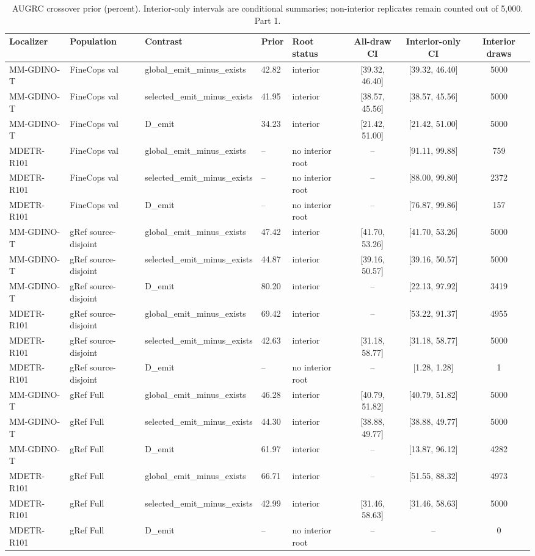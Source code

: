 \begin{table}[t]
\centering\footnotesize
\setlength{\tabcolsep}{3pt}
\renewcommand{\arraystretch}{1.15}
\caption{AUGRC crossover prior (percent). Interior-only intervals are conditional summaries; non-interior replicates remain counted out of 5,000. Part 1.}\label{tab:supp_v6_crossovers_1}
\begin{tabular}{@{}lllllccc@{}}\toprule
Localizer & Population & Contrast & Prior & Root status & All-draw CI & Interior-only CI & Interior draws\\\midrule
MM-GDINO-T & FineCops val & global\_emit\_minus\_exists & 42.82 & interior & [39.32, 46.40] & [39.32, 46.40] & 5000\\
MM-GDINO-T & FineCops val & selected\_emit\_minus\_exists & 41.95 & interior & [38.57, 45.56] & [38.57, 45.56] & 5000\\
MM-GDINO-T & FineCops val & D\_emit & 34.23 & interior & [21.42, 51.00] & [21.42, 51.00] & 5000\\
MDETR-R101 & FineCops val & global\_emit\_minus\_exists & -- & no interior root & -- & [91.11, 99.88] & 759\\
MDETR-R101 & FineCops val & selected\_emit\_minus\_exists & -- & no interior root & -- & [88.00, 99.80] & 2372\\
MDETR-R101 & FineCops val & D\_emit & -- & no interior root & -- & [76.87, 99.86] & 157\\
MM-GDINO-T & gRef source-disjoint & global\_emit\_minus\_exists & 47.42 & interior & [41.70, 53.26] & [41.70, 53.26] & 5000\\
MM-GDINO-T & gRef source-disjoint & selected\_emit\_minus\_exists & 44.87 & interior & [39.16, 50.57] & [39.16, 50.57] & 5000\\
MM-GDINO-T & gRef source-disjoint & D\_emit & 80.20 & interior & -- & [22.13, 97.92] & 3419\\
MDETR-R101 & gRef source-disjoint & global\_emit\_minus\_exists & 69.42 & interior & -- & [53.22, 91.37] & 4955\\
MDETR-R101 & gRef source-disjoint & selected\_emit\_minus\_exists & 42.63 & interior & [31.18, 58.77] & [31.18, 58.77] & 5000\\
MDETR-R101 & gRef source-disjoint & D\_emit & -- & no interior root & -- & [1.28, 1.28] & 1\\
MM-GDINO-T & gRef Full & global\_emit\_minus\_exists & 46.28 & interior & [40.79, 51.82] & [40.79, 51.82] & 5000\\
MM-GDINO-T & gRef Full & selected\_emit\_minus\_exists & 44.30 & interior & [38.88, 49.77] & [38.88, 49.77] & 5000\\
MM-GDINO-T & gRef Full & D\_emit & 61.97 & interior & -- & [13.87, 96.12] & 4282\\
MDETR-R101 & gRef Full & global\_emit\_minus\_exists & 66.71 & interior & -- & [51.55, 88.32] & 4973\\
MDETR-R101 & gRef Full & selected\_emit\_minus\_exists & 42.99 & interior & [31.46, 58.63] & [31.46, 58.63] & 5000\\
MDETR-R101 & gRef Full & D\_emit & -- & no interior root & -- & -- & 0\\
\bottomrule\end{tabular}
\end{table}
